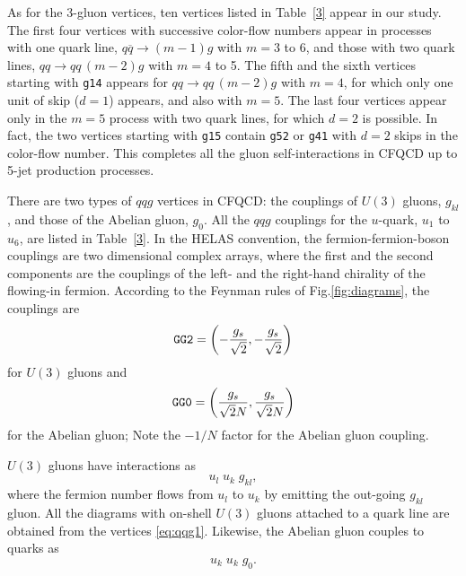 \documentclass[a4paper,11pt]{article}
\begin{document}
As for the 3-gluon vertices, ten vertices listed in
Table~\ref{3} appear in our study. The first four vertices with
successive color-flow numbers appear in processes with one quark line,
$q\overline{q}\rightarrow (m-1)g$
with $m=3$ to $6$, and those with two quark lines, $qq\rightarrow
qq\,(m-2)g$ with $m=4$ to 5. The fifth
and the sixth vertices starting with {\tt g14} appears for $qq\rightarrow qq\,(m-2)g$
with $m=4$, for which only one unit of skip ($d=1$) appears, and
also with $m=5$. The
last four vertices appear only in the $m=5$ process with two quark lines, for which
$d=2$ is possible. In fact, the two vertices starting with {\tt g15}
contain {\tt g52} or {\tt g41} with $d=2$ skips in the color-flow
number. This completes all the gluon self-interactions in CFQCD up to
5-jet production processes.

There are two types of $qqg$ vertices in CFQCD: the couplings of $U(3)$
gluons, $g_{kl}$, and those of the Abelian gluon,
$g_0$. All the $qqg$ couplings for the $u$-quark, $u_1$ to $u_6$,  are
listed in Table~\ref{3}. In the HELAS convention, the
fermion-fermion-boson couplings are two dimensional complex arrays,
where the first and the second components are the couplings of the left-
and the right-hand chirality of the flowing-in fermion. According to the
Feynman rules of Fig.\ref{fig:diagrams}, the couplings are
\begin{equation}
{\tt GG2}=\left(-\frac{g_s}{\sqrt{2}},-\frac{g_s}{\sqrt{2}}\right)
 \end{equation}
 for $U(3)$ gluons and
 \begin{equation}
 {\tt GG0}=\left(\frac{g_s}{\sqrt{2}N},\frac{g_s}{\sqrt{2}N}\right)
  \end{equation}
  for the Abelian gluon; Note  the $-1/N$ factor for the Abelian gluon coupling.

$U(3)$ gluons have interactions as
\begin{equation}
 u_l\; u_k\; g_{kl},
  \label{eq:qqg1}
\end{equation}
 where the fermion number flows from $u_l$ to $u_k$ by emitting the out-going $g_{kl}$ gluon. All the diagrams with on-shell $U(3)$ gluons
 attached to a quark line are obtained from the vertices
 \eqref{eq:qqg1}. Likewise, the Abelian gluon couples to quarks as
\begin{equation}
 u_k\; u_k\; g_0.
\end{equation}
\end{document}
